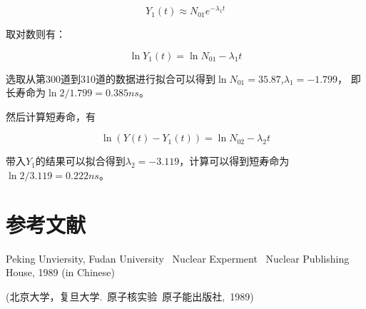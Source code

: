 \documentclass[a4paper,10.0pt,twoside]{npr}
\begin{document}
\begin{multicols}{2}
$$Y_1(t) \approx N_{01} e^{-\lambda_1 t}$$

取对数则有：

$$ \ln Y_1(t) = \ln N_{01} - \lambda_1 t$$

选取从第300道到310道的数据进行拟合可以得到$\ln N_{01} = 35.87$,$\lambda_1 = -1.799$， 即长寿命为$\ln 2 /1.799=0.385ns$。

然后计算短寿命，有

$$ \ln (Y(t) -Y_1(t)) = \ln N_{02} -\lambda_2 t$$

带入$Y_1$的结果可以拟合得到$\lambda_2  = -3.119$，计算可以得到短寿命为$\ln 2 /3.119=0.222ns$。


\section{参考文献}

\noindent
[1] Peking Unviersity, Fudan University \ Nuclear Experment
\ Nuclear Publishing House, 1989 (in Chinese)

\noindent
 (北京大学，复旦大学.\ 原子核实验\ 原子能出版社,\ 1989)

\end{multicols}

\newpage

\clearpage
\end{document}
